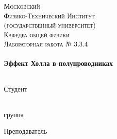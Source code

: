 \begin{titlepage}
\center %
 

\textsc{\LARGE Московский\\[-0.2cm]Физико-Технический Институт\\[0.1cm]\large (государственный университет)}\\[1.5cm] %
\textsc{\Large Кафедра общей физики}\\[0.1cm] %
\textsc{\large Лабораторная работа № 3.3.4}\\[0.5cm] %


\HRule
\\[0.6cm]
{ \huge \bfseries Эффект Холла в полупроводниках}
\\[0.3cm] %
\HRule
\\[1.5cm]


 

\begin{minipage}[t]{0.48\textwidth}
	\begin{flushleft} \large
		\textsf{Студент}\bigskip
		
		  \\[5mm]
		\underline{\hspace{30mm}} группа
	\end{flushleft}
\end{minipage}
\hfill
\begin{minipage}[t]{0.48\textwidth}
	\begin{flushright} \large
		\textsf{Преподаватель}\bigskip
		
		  \\[5mm]
	\end{flushright}
\end{minipage}


\end{titlepage}
